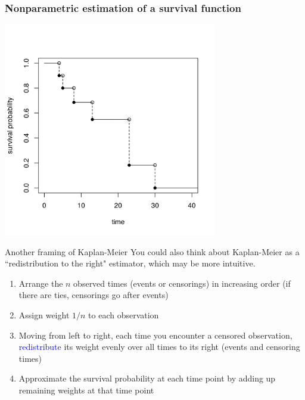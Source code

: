 \documentclass[10pt,t]{beamer}
\begin{document}
\begin{frame}
\frametitle{Nonparametric estimation of a survival function}

\centering
\includegraphics[width=0.7\textwidth]{figs/km_small_example.png}
\end{frame}

\begin{frame}{Another framing of Kaplan-Meier}
	You could also think about Kaplan-Meier as a ``redistribution to the right" estimator, which may be more intuitive. 
	\begin{enumerate}
		\item Arrange the $n$ observed times (events or censorings) in increasing order (if there are ties, censorings go after events)
		\item Assign weight $1/n$ to each observation
		\item Moving from left to right, each time you encounter a censored observation, \textcolor{blue}{redistribute} its weight evenly over all times to its right (events and censoring times)
		\item Approximate the survival probability at each time point by adding up remaining weights at that time point
	\end{enumerate}
\end{frame}
\end{document}
